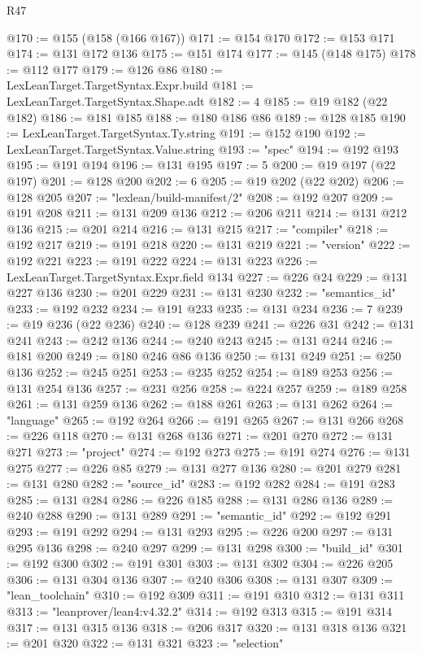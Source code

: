 \begin{lexlean}{R47}
\begin{coremodule}
@170 := @155 (@158 (@166 @167))
@171 := @154 @170
@172 := @153 @171
@174 := @131 @172 @136
@175 := @151 @174
@177 := @145 (@148 @175)
@178 := @112 @177
@179 := @126 @86
@180 := LexLeanTarget.TargetSyntax.Expr.build
@181 := LexLeanTarget.TargetSyntax.Shape.adt
@182 := 4
@185 := @19 @182 (@22 @182)
@186 := @181 @185
@188 := @180 @186 @86
@189 := @128 @185
@190 := LexLeanTarget.TargetSyntax.Ty.string
@191 := @152 @190
@192 := LexLeanTarget.TargetSyntax.Value.string
@193 := "spec"
@194 := @192 @193
@195 := @191 @194
@196 := @131 @195
@197 := 5
@200 := @19 @197 (@22 @197)
@201 := @128 @200
@202 := 6
@205 := @19 @202 (@22 @202)
@206 := @128 @205
@207 := "lexlean/build-manifest/2"
@208 := @192 @207
@209 := @191 @208
@211 := @131 @209 @136
@212 := @206 @211
@214 := @131 @212 @136
@215 := @201 @214
@216 := @131 @215
@217 := "compiler"
@218 := @192 @217
@219 := @191 @218
@220 := @131 @219
@221 := "version"
@222 := @192 @221
@223 := @191 @222
@224 := @131 @223
@226 := LexLeanTarget.TargetSyntax.Expr.field @134
@227 := @226 @24
@229 := @131 @227 @136
@230 := @201 @229
@231 := @131 @230
@232 := "semantics_id"
@233 := @192 @232
@234 := @191 @233
@235 := @131 @234
@236 := 7
@239 := @19 @236 (@22 @236)
@240 := @128 @239
@241 := @226 @31
@242 := @131 @241
@243 := @242 @136
@244 := @240 @243
@245 := @131 @244
@246 := @181 @200
@249 := @180 @246 @86 @136
@250 := @131 @249
@251 := @250 @136
@252 := @245 @251
@253 := @235 @252
@254 := @189 @253
@256 := @131 @254 @136
@257 := @231 @256
@258 := @224 @257
@259 := @189 @258
@261 := @131 @259 @136
@262 := @188 @261
@263 := @131 @262
@264 := "language"
@265 := @192 @264
@266 := @191 @265
@267 := @131 @266
@268 := @226 @118
@270 := @131 @268 @136
@271 := @201 @270
@272 := @131 @271
@273 := "project"
@274 := @192 @273
@275 := @191 @274
@276 := @131 @275
@277 := @226 @85
@279 := @131 @277 @136
@280 := @201 @279
@281 := @131 @280
@282 := "source_id"
@283 := @192 @282
@284 := @191 @283
@285 := @131 @284
@286 := @226 @185
@288 := @131 @286 @136
@289 := @240 @288
@290 := @131 @289
@291 := "semantic_id"
@292 := @192 @291
@293 := @191 @292
@294 := @131 @293
@295 := @226 @200
@297 := @131 @295 @136
@298 := @240 @297
@299 := @131 @298
@300 := "build_id"
@301 := @192 @300
@302 := @191 @301
@303 := @131 @302
@304 := @226 @205
@306 := @131 @304 @136
@307 := @240 @306
@308 := @131 @307
@309 := "lean_toolchain"
@310 := @192 @309
@311 := @191 @310
@312 := @131 @311
@313 := "leanprover/lean4:v4.32.2"
@314 := @192 @313
@315 := @191 @314
@317 := @131 @315 @136
@318 := @206 @317
@320 := @131 @318 @136
@321 := @201 @320
@322 := @131 @321
@323 := "selection"

\end{coremodule}
\end{lexlean}
